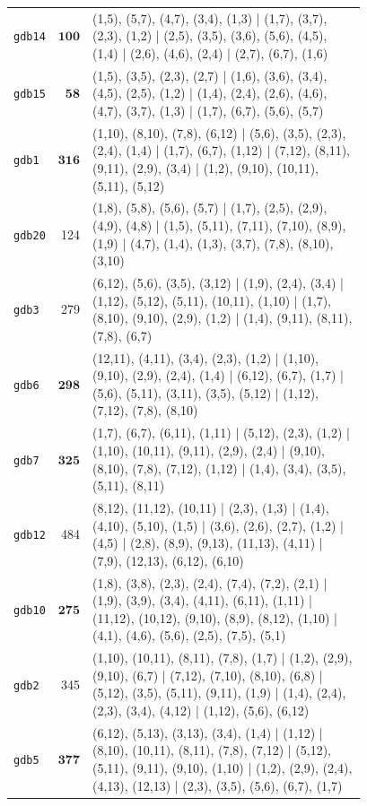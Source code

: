 \begin{landscape}
\begin{longtable}{lr>{\tiny\raggedright\arraybackslash}p{0.78\linewidth}}
\texttt{gdb14} & $\mathbf{100}$ & (1,5), (5,7), (4,7), (3,4), (1,3) | (1,7), (3,7), (2,3), (1,2) | (2,5), (3,5), (3,6), (5,6), (4,5), (1,4) | (2,6), (4,6), (2,4) | (2,7), (6,7), (1,6) \\[2pt]
\texttt{gdb15} & $\mathbf{58}$ & (1,5), (3,5), (2,3), (2,7) | (1,6), (3,6), (3,4), (4,5), (2,5), (1,2) | (1,4), (2,4), (2,6), (4,6), (4,7), (3,7), (1,3) | (1,7), (6,7), (5,6), (5,7) \\[2pt]
\texttt{gdb1} & $\mathbf{316}$ & (1,10), (8,10), (7,8), (6,12) | (5,6), (3,5), (2,3), (2,4), (1,4) | (1,7), (6,7), (1,12) | (7,12), (8,11), (9,11), (2,9), (3,4) | (1,2), (9,10), (10,11), (5,11), (5,12) \\[2pt]
\texttt{gdb20} & 124 & (1,8), (5,8), (5,6), (5,7) | (1,7), (2,5), (2,9), (4,9), (4,8) | (1,5), (5,11), (7,11), (7,10), (8,9), (1,9) | (4,7), (1,4), (1,3), (3,7), (7,8), (8,10), (3,10) \\[2pt]
\texttt{gdb3} & 279 & (6,12), (5,6), (3,5), (3,12) | (1,9), (2,4), (3,4) | (1,12), (5,12), (5,11), (10,11), (1,10) | (1,7), (8,10), (9,10), (2,9), (1,2) | (1,4), (9,11), (8,11), (7,8), (6,7) \\[2pt]
\texttt{gdb6} & $\mathbf{298}$ & (12,11), (4,11), (3,4), (2,3), (1,2) | (1,10), (9,10), (2,9), (2,4), (1,4) | (6,12), (6,7), (1,7) | (5,6), (5,11), (3,11), (3,5), (5,12) | (1,12), (7,12), (7,8), (8,10) \\[2pt]
\texttt{gdb7} & $\mathbf{325}$ & (1,7), (6,7), (6,11), (1,11) | (5,12), (2,3), (1,2) | (1,10), (10,11), (9,11), (2,9), (2,4) | (9,10), (8,10), (7,8), (7,12), (1,12) | (1,4), (3,4), (3,5), (5,11), (8,11) \\[2pt]
\texttt{gdb12} & 484 & (8,12), (11,12), (10,11) | (2,3), (1,3) | (1,4), (4,10), (5,10), (1,5) | (3,6), (2,6), (2,7), (1,2) | (4,5) | (2,8), (8,9), (9,13), (11,13), (4,11) | (7,9), (12,13), (6,12), (6,10) \\[2pt]
\texttt{gdb10} & $\mathbf{275}$ & (1,8), (3,8), (2,3), (2,4), (7,4), (7,2), (2,1) | (1,9), (3,9), (3,4), (4,11), (6,11), (1,11) | (11,12), (10,12), (9,10), (8,9), (8,12), (1,10) | (4,1), (4,6), (5,6), (2,5), (7,5), (5,1) \\[2pt]
\texttt{gdb2} & 345 & (1,10), (10,11), (8,11), (7,8), (1,7) | (1,2), (2,9), (9,10), (6,7) | (7,12), (7,10), (8,10), (6,8) | (5,12), (3,5), (5,11), (9,11), (1,9) | (1,4), (2,4), (2,3), (3,4), (4,12) | (1,12), (5,6), (6,12) \\[2pt]
\texttt{gdb5} & $\mathbf{377}$ & (6,12), (5,13), (3,13), (3,4), (1,4) | (1,12) | (8,10), (10,11), (8,11), (7,8), (7,12) | (5,12), (5,11), (9,11), (9,10), (1,10) | (1,2), (2,9), (2,4), (4,13), (12,13) | (2,3), (3,5), (5,6), (6,7), (1,7) \\[2pt]

\end{longtable}
\end{landscape}
